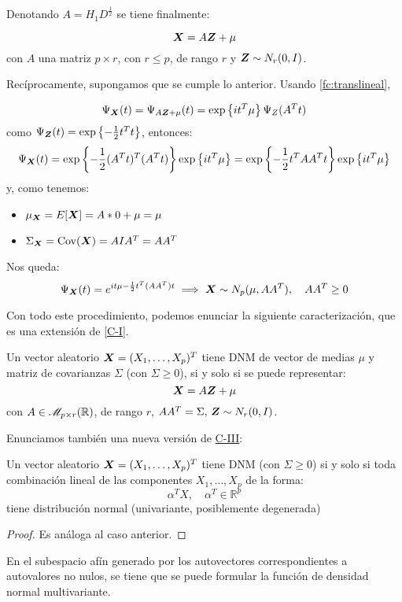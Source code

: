 Denotando $A= H_1D^{\frac{1}{2}}$ se tiene finalmente:

\[
\boldsymbol{X} = A\boldsymbol{Z} + \mu
\]
con $A$ una matriz $p\times r$, con $r\leq p$, de rango $r$ y $\boldsymbol{Z}\sim N_r(0,I)$.

Recíprocamente, supongamos que se cumple lo anterior. Usando \ref{fc:translineal},

\[
\Psi_{\boldsymbol{X}}(t) = \Psi_{A\boldsymbol{Z} + \mu}(t)  = \exp\left\{it^T \mu\right\}\Psi_Z(A^Tt)
\]
como $\Psi_{\boldsymbol{Z}}(t) = \exp\left\{-\frac{1}{2}t^T t\right\}$, entonces:
\[
 \Psi_{\boldsymbol{X}}(t) = \exp\left\{-\frac{1}{2}(A^T t)^T(A^T t)\right\} \exp\left\{it^T \mu\right\} = \exp\left\{-\frac{1}{2}t^T A A^T t\right\} \exp\left\{it^T \mu\right\} 
\]
y, como tenemos:
\begin{itemize}
  \item $\mu_{\boldsymbol{X}} = E[\boldsymbol{X}]=A*0 +\mu = \mu$
  \item $\Sigma_{\boldsymbol{X}} = \operatorname{Cov}(\boldsymbol{X}) = AIA^T = AA^T$
\end{itemize}
Nos queda:
\[
 \Psi_{\boldsymbol{X}}(t)= e^{it\mu - \frac{1}{2}t^T(AA^T)t} \implies \boldsymbol{X} \sim N_p(\mu, AA^T), \quad AA^T \geq 0
\]

Con todo este procedimiento, podemos enunciar la siguiente caracterización, que es una extensión de \hyperref[posvar:car-i]{[C-I]}.
\begin{nprop}[Caracterización I]
  Un vector aleatorio $\boldsymbol{X} = (X_1,\dots,X_p)^T$ tiene DNM de vector de medias $\mu$ y matriz de covarianzas $\Sigma$ (con $\Sigma \geq 0$), si y solo si se puede representar:
  \[
  \boldsymbol{X} = A\boldsymbol{Z} + \mu
  \] con $A\in \mathscr{M}_{p\times r}(\mathbb{R})$, de rango $r$, $AA^T = \Sigma,\, \boldsymbol{Z}\sim N_r(0,I)$.
\end{nprop}

Enunciamos también una nueva versión de \hyperref[posvar:car-iii]{C-III}:
\begin{nprop}
  Un vector aleatorio $\boldsymbol{X} = (X_1,\dots,X_p)^T$ tiene DNM (con $\Sigma \geq 0$) si y solo si toda combinación lineal de las componentes $X_1,\dots,X_p$ de la forma:
\[
  \alpha^T X, \quad \alpha^T \in \mathbb R^p
\]
tiene distribución normal (univariante, posiblemente degenerada)
\end{nprop}
\begin{proof}
Es análoga al caso anterior.
\end{proof}

\begin{ndef}
  En el subespacio afín generado por los autovectores correspondientes a autovalores no nulos, se tiene que se puede formular la función de densidad normal multivariante.
\end{ndef}

